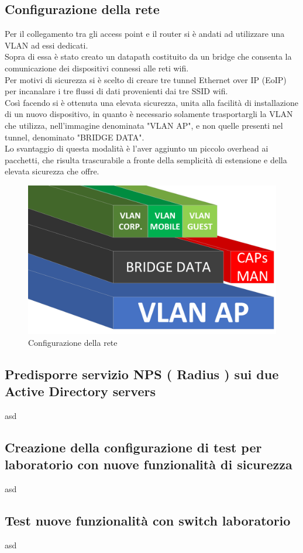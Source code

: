 \documentclass[Realizzazione.tex]{subfiles}
\begin{document}
\subsection{Configurazione della rete}
Per il collegamento tra gli access point e il router si è andati ad utilizzare una VLAN ad essi dedicati. \\
Sopra di essa è stato creato un datapath costituito da un bridge che consenta la comunicazione dei dispositivi connessi alle reti wifi. \\
Per motivi di sicurezza si è scelto di creare tre tunnel Ethernet over IP (EoIP) per incanalare i tre flussi di dati provenienti dai tre SSID wifi. \\
Così facendo si è ottenuta una elevata sicurezza, unita alla facilità di installazione di un nuovo dispositivo, in quanto è necessario solamente trasportargli la VLAN che utilizza, nell'immagine denominata "VLAN AP", e non quelle presenti nel tunnel, denominato "BRIDGE DATA". \\
Lo svantaggio di questa modalità è l'aver aggiunto un piccolo overhead ai pacchetti, che risulta trascurabile a fronte della semplicità di estensione e della elevata sicurezza che offre.

\begin{figure}[H]
	\centering
	\includegraphics[width=0.6\linewidth]{"images/VLAN"}
	\caption{Configurazione della rete}
	\label{fig:Configurazione della rete}
\end{figure}

\subsection{Predisporre servizio NPS ( Radius ) sui due Active Directory servers} 
asd
\subsection{Creazione della configurazione di test per laboratorio con nuove funzionalità di sicurezza} 
asd
\subsection{Test nuove funzionalità con switch laboratorio} 
asd
\end{document}
